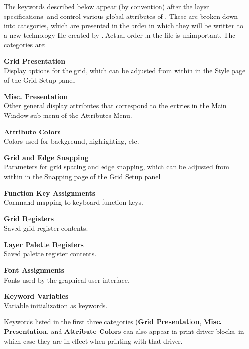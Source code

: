 The keywords described below appear (by convention) after the layer
specifications, and control various global attributes of {\Xic}. 
These are broken down into categories, which are presented in the
order in which they will be written to a new technology file created
by {\Xic}.  Actual order in the file is unimportant.  The categories
are:

\begin{description}
\item{\bf Grid Presentation}\\
Display options for the grid, which can be adjusted from within
{\Xic} in the {\cb Style} page of the {\cb Grid Setup} panel.

\item{\bf Misc. Presentation}\\
Other general display attributes that correspond to the entries in the
{\cb Main Window} sub-menu of the {\cb Attributes Menu}.

\item{\bf Attribute Colors}\\
Colors used for background, highlighting, etc.

\item{\bf Grid and Edge Snapping}\\
Parameters for grid spacing and edge snapping, which can be adjusted
from within {\Xic} in the {\cb Snapping} page of the {\cb Grid Setup}
panel.

\item{\bf Function Key Assignments}\\
Command mapping to keyboard function keys.

\item{\bf Grid Registers}\\
Saved grid register contents.

\item{\bf Layer Palette Registers}\\
Saved palette register contents.

\item{\bf Font Assignments}\\
Fonts used by the graphical user interface.

\item{\bf Keyword Variables}\\
Variable initialization as keywords.
\end{description}

Keywords listed in the first three categories ({\bf Grid
Presentation}, {\bf Misc.  Presentation}, and {\bf Attribute Colors}
can also appear in print driver blocks, in which case they are in
effect when printing with that driver.

